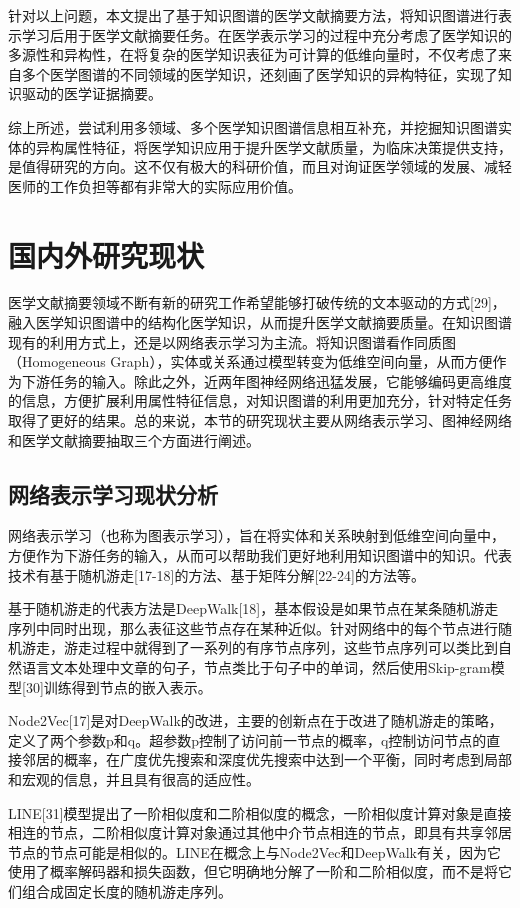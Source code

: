 \documentclass[algorithmlist, figurelist,tablelist, nomlist,masters]{seuthesix}
\begin{document}
针对以上问题，本文提出了基于知识图谱的医学文献摘要方法，将知识图谱进行表示学习后用于医学文献摘要任务。在医学表示学习的过程中充分考虑了医学知识的多源性和异构性，在将复杂的医学知识表征为可计算的低维向量时，不仅考虑了来自多个医学图谱的不同领域的医学知识，还刻画了医学知识的异构特征，实现了知识驱动的医学证据摘要。

综上所述，尝试利用多领域、多个医学知识图谱信息相互补充，并挖掘知识图谱实体的异构属性特征，将医学知识应用于提升医学文献质量，为临床决策提供支持，是值得研究的方向。这不仅有极大的科研价值，而且对询证医学领域的发展、减轻医师的工作负担等都有非常大的实际应用价值。



\section{国内外研究现状}
医学文献摘要领域不断有新的研究工作希望能够打破传统的文本驱动的方式[29]，融入医学知识图谱中的结构化医学知识，从而提升医学文献摘要质量。在知识图谱现有的利用方式上，还是以网络表示学习为主流。将知识图谱看作同质图（Homogeneous Graph），实体或关系通过模型转变为低维空间向量，从而方便作为下游任务的输入。除此之外，近两年图神经网络迅猛发展，它能够编码更高维度的信息，方便扩展利用属性特征信息，对知识图谱的利用更加充分，针对特定任务取得了更好的结果。总的来说，本节的研究现状主要从网络表示学习、图神经网络和医学文献摘要抽取三个方面进行阐述。

\subsection{网络表示学习现状分析}

网络表示学习（也称为图表示学习），旨在将实体和关系映射到低维空间向量中，方便作为下游任务的输入，从而可以帮助我们更好地利用知识图谱中的知识。代表技术有基于随机游走[17-18]的方法、基于矩阵分解[22-24]的方法等。

基于随机游走的代表方法是DeepWalk[18]，基本假设是如果节点在某条随机游走序列中同时出现，那么表征这些节点存在某种近似。针对网络中的每个节点进行随机游走，游走过程中就得到了一系列的有序节点序列，这些节点序列可以类比到自然语言文本处理中文章的句子，节点类比于句子中的单词，然后使用Skip-gram模型[30]训练得到节点的嵌入表示。

Node2Vec[17]是对DeepWalk的改进，主要的创新点在于改进了随机游走的策略，定义了两个参数p和q。超参数p控制了访问前一节点的概率，q控制访问节点的直接邻居的概率，在广度优先搜索和深度优先搜索中达到一个平衡，同时考虑到局部和宏观的信息，并且具有很高的适应性。

LINE[31]模型提出了一阶相似度和二阶相似度的概念，一阶相似度计算对象是直接相连的节点，二阶相似度计算对象通过其他中介节点相连的节点，即具有共享邻居节点的节点可能是相似的。LINE在概念上与Node2Vec和DeepWalk有关，因为它使用了概率解码器和损失函数，但它明确地分解了一阶和二阶相似度，而不是将它们组合成固定长度的随机游走序列。
\end{document}
